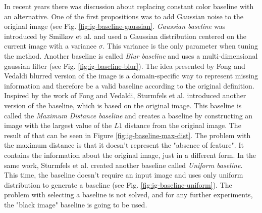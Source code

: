 In recent years there was discussion about replacing constant color baseline with an alternative. One of the first propositions was to add Gaussian noise to the original image (see Fig. \ref{fig:ig-baseline-gaussian}. \textit{Gaussian baseline} was introduced by Smilkov et al. \cite{smilkov2017smoothgrad} and used a Gaussian distribution centered on the current image with a variance $\sigma$. This variance is the only parameter when tuning the method. Another baseline is called \textit{Blur baseline} and uses a multi-dimensional gaussian filter (see Fig. \ref{fig:ig-baseline-blur}). The idea presented by Fong and Vedaldi \cite{fong2017interpretable} blurred version of the image is a domain-specific way to represent missing information and therefore be a valid baseline according to the original definition. Inspired by the work of Fong and Vedaldi, Sturmfels et al. \cite{sturmfels2020visualizing} introduced another version of the baseline, which is based on the original image. This baseline is called the \textit{Maximum Distance baseline} and creates a baseline by constructing an image with the largest value of the $L1$ distance from the original image. The result of that can be seen in Figure \ref{fig:ig-baseline-max-dist}. The problem with the maximum distance is that it doesn't represent the "absence of feature". It contains the information about the original image, just in a different form. In the same work, Sturmfels et al. created another baseline called \textit{Uniform baseline}. This time, the baseline doesn't require an input image and uses only uniform distribution to generate a baseline (see Fig. \ref{fig:ig-baseline-uniform}). The problem with selecting a baseline is not solved, and for any further experiments, the "black image" baseline is going to be used.


